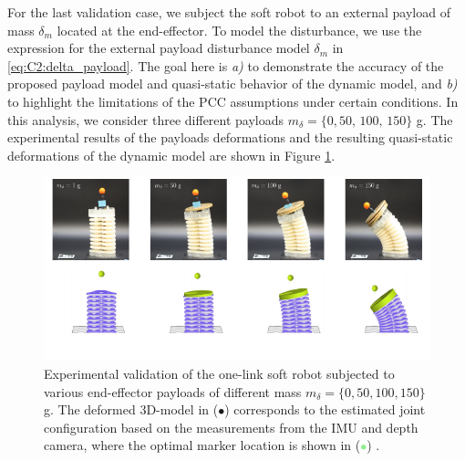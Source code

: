For the last validation case, we subject the soft robot to an external payload of mass $\delta_m$ located at the end-effector. To model the disturbance, we use the expression for the external payload disturbance model $\delta_m$ in \eqref{eq:C2:delta_payload}. The goal here is \textit{a)} to demonstrate the accuracy of the proposed payload model and quasi-static behavior of the dynamic model, and \textit{b)} to highlight the limitations of the PCC assumptions under certain conditions. In this analysis, we consider three different payloads $m_\delta = \{0, 50,\,100,\,150\}$ \si{\gram}. The experimental results of the payloads deformations and the resulting quasi-static deformations of the dynamic model are shown in Figure \ref{fig:C2:compare_deflect}. 

%
\begin{figure}[!t]
  \centering
  \includegraphics*{./pdf/thesis-figure-4-18.pdf}
  \vspace{-5mm}
  \caption{Experimental validation of the one-link soft robot subjected to various end-effector payloads of different mass $m_\delta = \{0,50,100,150\}$ \si{\gram}. The deformed 3D-model in (\textcolor{PurpleLight}{$\bullet$}) corresponds to the estimated joint configuration based on the measurements from the IMU and depth camera, where the optimal marker location is shown in (\textcolor{lightgreen}{$\bullet$}) .}
  \label{fig:C2:compare_deflect}
\end{figure}
%

